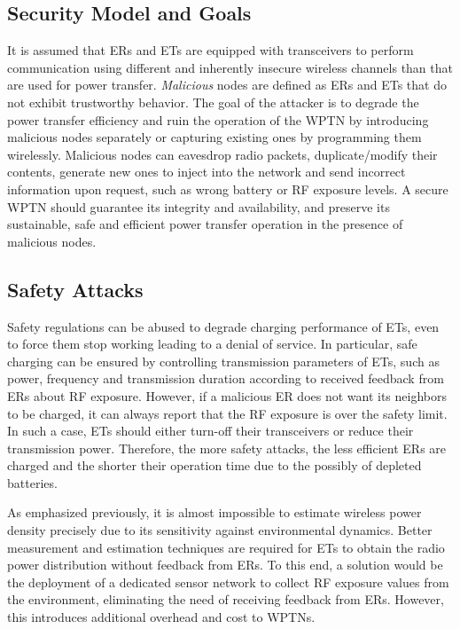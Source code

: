 \documentclass[journal,10pt,draftclsnofoot,onecolumn]{IEEEtran}
\begin{document}
\subsection{Security Model and Goals}

It is assumed that ERs and ETs are equipped with transceivers to perform communication using different and inherently insecure wireless channels than that are used for power transfer. \emph{Malicious} nodes are defined as ERs and ETs that do not exhibit trustworthy behavior. The goal of the attacker is to degrade the power transfer efficiency and ruin the operation of the WPTN by introducing malicious nodes separately or capturing existing ones by programming them wirelessly. Malicious nodes can eavesdrop radio packets, duplicate/modify their contents, generate new ones to inject into the network and send incorrect information upon request, such as wrong battery or RF exposure levels. A secure WPTN should guarantee its integrity and availability, and preserve its sustainable, safe and efficient power transfer operation in the presence of malicious nodes. 

\subsection{Safety Attacks}

Safety regulations can be abused to degrade charging performance of ETs, even to force them stop working leading to a denial of service. In particular, safe charging can be ensured by controlling transmission parameters of ETs, such as power, frequency and transmission duration according to received feedback from ERs about RF exposure. However, if a malicious ER does not want its neighbors to be charged, it can always report that the RF exposure is over the safety limit. In such a case, ETs should either turn-off their transceivers or reduce their transmission power. Therefore, the more safety attacks, the less efficient ERs are charged and the shorter their operation time due to the possibly of depleted batteries. 

As emphasized previously, it is almost impossible to estimate wireless power density precisely due to its sensitivity against environmental dynamics. Better measurement and estimation techniques are required for ETs to obtain the radio power distribution without feedback from ERs. To this end, a solution would be the deployment of a dedicated sensor network to collect RF exposure values from the environment, eliminating the need of receiving feedback from ERs. However, this introduces additional overhead and cost to WPTNs.
\end{document}
